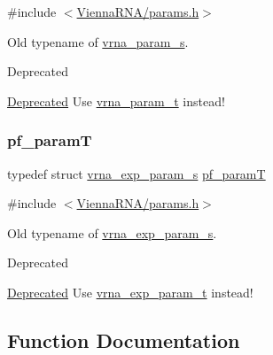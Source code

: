 {\ttfamily \#include $<$\hyperlink{params_8h}{Vienna\+R\+N\+A/params.\+h}$>$}



Old typename of \hyperlink{group__energy__parameters_structvrna__param__s}{vrna\+\_\+param\+\_\+s}. 

\begin{DoxyRefDesc}{Deprecated}
\item[\hyperlink{deprecated__deprecated000092}{Deprecated}]Use \hyperlink{group__energy__parameters_ga8a69ca7d787e4fd6079914f5343a1f35}{vrna\+\_\+param\+\_\+t} instead! \end{DoxyRefDesc}
\mbox{\label{group__energy__parameters_ga8bffe1828e2cbec101769f5cc0b1535b}} 
\subsubsection{\texorpdfstring{pf\+\_\+paramT}{pf\_paramT}}
{\footnotesize\ttfamily typedef struct \hyperlink{group__energy__parameters_structvrna__exp__param__s}{vrna\+\_\+exp\+\_\+param\+\_\+s} \hyperlink{group__energy__parameters_ga8bffe1828e2cbec101769f5cc0b1535b}{pf\+\_\+paramT}}



{\ttfamily \#include $<$\hyperlink{params_8h}{Vienna\+R\+N\+A/params.\+h}$>$}



Old typename of \hyperlink{group__energy__parameters_structvrna__exp__param__s}{vrna\+\_\+exp\+\_\+param\+\_\+s}. 

\begin{DoxyRefDesc}{Deprecated}
\item[\hyperlink{deprecated__deprecated000093}{Deprecated}]Use \hyperlink{group__energy__parameters_ga01d8b92fe734df8d79a6169482c7d8d8}{vrna\+\_\+exp\+\_\+param\+\_\+t} instead! \end{DoxyRefDesc}


\subsection{Function Documentation}
\mbox{\label{group__energy__parameters_gad0e3e7e74bdc50d1709d40c92993185e}} 
